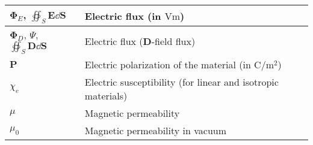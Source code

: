 \begin{xltabular}{\textwidth}{XX}
	\(\mathbf{\Phi}_E\)\cite{wiki:electric-flux}, \(\oiint_S \mathbf{E} \dd{\mathbf{S}}\)                                                    & Electric flux (in \(\si{\volt\meter}\))                                                                                                                                                  \\ \hline
	\(\mathbf{\Phi}_D\)\cite{wiki:D-field-flux}, \(\varPsi\)\cite{ramoFieldsWavesCommunication1994}, \(\oiint_S \mathbf{D} \dd{\mathbf{S}}\) & Electric flux (\(\mathbf{D}\)-field flux)                                                                                                                                                \\ \hline
	\(\mathbf{P}\)                                                                                                                           & Electric polarization of the material (in \(\si{\coulomb\per\meter\squared}\))                                                                                                           \\ \hline
	\(\chi_e\)                                                                                                                               & Electric susceptibility (for linear and isotropic materials)                                                                                                                             \\ \hline
	\(\mu\)                                                                                                                                  & Magnetic permeability                                                                                                                                                                    \\ \hline
	\(\mu_0\)                                                                                                                                & Magnetic permeability in vacuum                                                                                                                                                          \\
\end{xltabular}